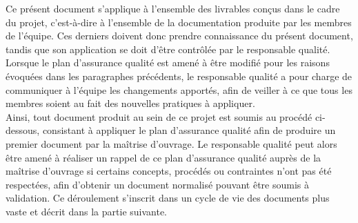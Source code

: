 Ce présent document s’applique à l’ensemble des livrables conçus dans le cadre du projet, c’est-à-dire à l’ensemble de la documentation produite par les membres de l’équipe. Ces derniers doivent donc prendre connaissance du présent document, tandis que son application se doit d’être contrôlée par le responsable qualité. Lorsque le plan d’assurance qualité est amené à être modifié pour les raisons évoquées dans les paragraphes précédents, le responsable qualité a pour charge de communiquer à l’équipe les changements apportés, afin de veiller à ce que tous les membres soient au fait des nouvelles pratiques à appliquer. \\

Ainsi, tout document produit au sein de ce projet est soumis au procédé ci-dessous, consistant à appliquer le plan d’assurance qualité afin de produire un premier document par la maîtrise d’ouvrage. Le responsable qualité peut alors être amené à réaliser un rappel de ce plan d’assurance qualité auprès de la maîtrise d’ouvrage si certains concepts, procédés ou contraintes n’ont pas été respectées, afin d’obtenir un document normalisé pouvant être soumis à validation. Ce déroulement s’inscrit dans un cycle de vie des documents plus vaste et décrit dans la partie suivante.

